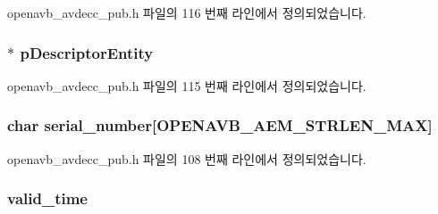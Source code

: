 openavb\+\_\+avdecc\+\_\+pub.\+h 파일의 116 번째 라인에서 정의되었습니다.

\subsubsection[{\texorpdfstring{p\+Descriptor\+Entity}{pDescriptorEntity}}]{$\ast$ p\+Descriptor\+Entity}\hypertarget{structopenavb__avdecc__cfg__t_a268a49d820d3f18d5c6476073fc6c521}{}\label{structopenavb__avdecc__cfg__t_a268a49d820d3f18d5c6476073fc6c521}


openavb\+\_\+avdecc\+\_\+pub.\+h 파일의 115 번째 라인에서 정의되었습니다.

\subsubsection[{\texorpdfstring{serial\+\_\+number}{serial_number}}]{\setlength{\rightskip}{0pt plus 5cm}char serial\+\_\+number\mbox{[}{\bf O\+P\+E\+N\+A\+V\+B\+\_\+\+A\+E\+M\+\_\+\+S\+T\+R\+L\+E\+N\+\_\+\+M\+AX}\mbox{]}}\hypertarget{structopenavb__avdecc__cfg__t_a93332d47b2b17f082c032a02a1f656c3}{}\label{structopenavb__avdecc__cfg__t_a93332d47b2b17f082c032a02a1f656c3}


openavb\+\_\+avdecc\+\_\+pub.\+h 파일의 108 번째 라인에서 정의되었습니다.

\subsubsection[{\texorpdfstring{valid\+\_\+time}{valid_time}}]{ valid\+\_\+time}\hypertarget{structopenavb__avdecc__cfg__t_aebe5bad8aaf2356c644fc10e5c3f8fdf}{}\label{structopenavb__avdecc__cfg__t_aebe5bad8aaf2356c644fc10e5c3f8fdf}



